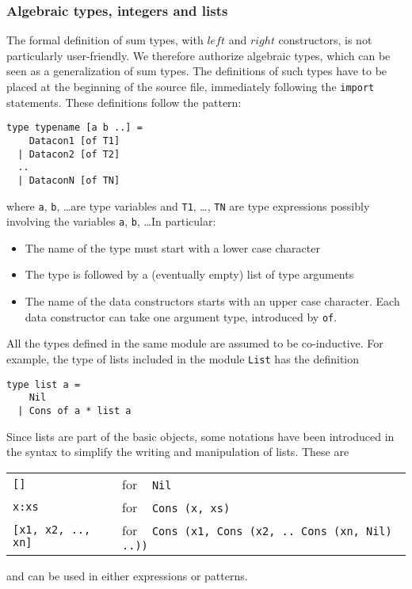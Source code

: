 \subsubsection{Algebraic types, integers and lists}

The formal definition of sum types, with $left$ and $right$ constructors, 
is not particularly user-friendly. We therefore authorize algebraic types, 
which can be seen as a generalization of sum types. The definitions of such 
types have to be placed at the beginning of the source file, immediately 
following the \verb#import# statements. These definitions follow the pattern: 
\begin{verbatim}
type typename [a b ..] =
    Datacon1 [of T1]
  | Datacon2 [of T2]
  ..
  | DataconN [of TN]
\end{verbatim}
where \verb#a#, \verb#b#, \ldots are type variables and \verb#T1#, \ldots, 
\verb#TN# are type expressions possibly involving the variables \verb#a#, 
\verb#b#, \ldots In particular:
\begin{itemize}
  \item The name of the type must start with a lower case character
  \item The type is followed by a (eventually empty) list of type arguments
  \item The name of the data constructors starts with an upper case  
  character. Each data constructor can take one argument type, introduced 
  by \verb#of#.
\end{itemize}

All the types defined in the same module are assumed to be co-inductive. For 
example, the type of lists included in the module \verb#List# has the 
definition
\begin{verbatim}
type list a =
    Nil
  | Cons of a * list a
\end{verbatim}
Since lists are part of the basic objects, some notations have been introduced in the syntax to simplify the writing and manipulation of lists. 
These are
\begin{center}
\begin{tabular}{ll}
  \verb#[]#               & for ~ \verb#Nil# \\
  \verb#x:xs#             & for ~ \verb#Cons (x, xs)# \\
  \verb#[x1, x2, .., xn]# & for ~ 
                            \verb#Cons (x1, Cons (x2, .. Cons (xn, Nil) ..))#
\end{tabular}
\end{center}
and can be used in either expressions or patterns.

